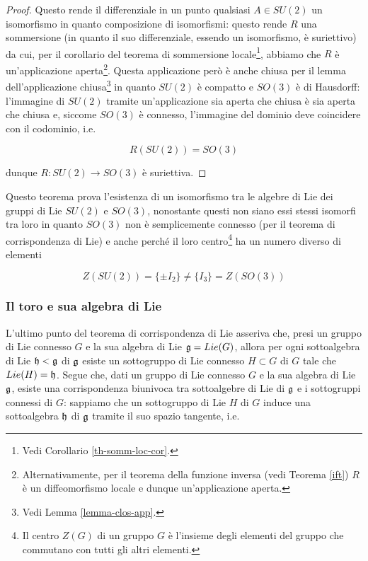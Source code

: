 \begin{proof}
	Questo rende il differenziale in un punto qualsiasi $ A \in SU(2) $ un isomorfismo in quanto composizione di isomorfismi: questo rende $ R $ una sommersione (in quanto il suo differenziale, essendo un isomorfismo, è suriettivo) da cui, per il corollario del teorema di sommersione locale\footnote{%
		Vedi Corollario \ref{th-somm-loc-cor}.%
	}, abbiamo che $ R $ è un'applicazione aperta\footnote{%
		Alternativamente, per il teorema della funzione inversa (vedi Teorema \ref{ift}) $ R $ è un diffeomorfismo locale e dunque un'applicazione aperta.%
	}. Questa applicazione però è anche chiusa per il lemma dell'applicazione chiusa\footnote{%
		Vedi Lemma \ref{lemma-clos-app}.%
	} in quanto $ SU(2) $ è compatto e $ SO(3) $ è di Hausdorff: l'immagine di $ SU(2) $ tramite un'applicazione sia aperta che chiusa è sia aperta che chiusa e, siccome $ SO(3) $ è connesso, l'immagine del dominio deve coincidere con il codominio, i.e.

	\begin{equation}
		R(SU(2)) = SO(3)
	\end{equation}
	
	dunque $ R : SU(2) \to SO(3) $ è suriettiva.
\end{proof}

\begin{remark}
	Questo teorema prova l'esistenza di un isomorfismo tra le algebre di Lie dei gruppi di Lie $ SU(2) $ e $ SO(3) $, nonostante questi non siano essi stessi isomorfi tra loro in quanto $ SO(3) $ non è semplicemente connesso (per il teorema di corrispondenza di Lie) e anche perché il loro centro\footnote{%
		Il centro $ Z(G) $ di un gruppo $ G $ è l'insieme degli elementi del gruppo che commutano con tutti gli altri elementi.%
	} ha un numero diverso di elementi
	
	\begin{equation}
		Z(SU(2)) = \{ \pm I_{2} \} \neq \{ I_{3} \} = Z(SO(3))
	\end{equation}
\end{remark}

\subsubsection{Il toro e sua algebra di Lie}

L'ultimo punto del teorema di corrispondenza di Lie asseriva che, presi un gruppo di Lie  connesso $ G $ e la sua algebra di Lie $ \mathfrak{g} = Lie(G) $, allora per ogni sottoalgebra di Lie $ \mathfrak{h} < \mathfrak{g} $ di $ \mathfrak{g} $ esiste un sottogruppo di Lie connesso $ H \subset G $ di $ G $ tale che $ Lie(H) = \mathfrak{h} $. Segue che, dati un gruppo di Lie connesso $ G $ e la sua algebra di Lie $ \mathfrak{g} $, esiste una corrispondenza biunivoca tra sottoalgebre di Lie di $ \mathfrak{g} $ e i sottogruppi connessi di $ G $: sappiamo che un sottogruppo di Lie $ H $ di $ G $ induce una sottoalgebra $ \mathfrak{h} $ di $ \mathfrak{g} $ tramite il suo spazio tangente, i.e.


